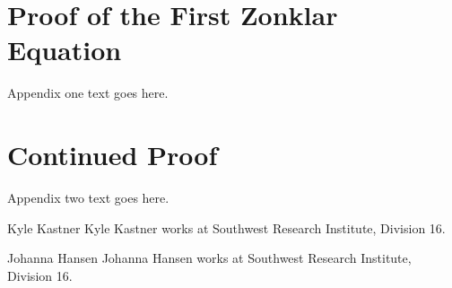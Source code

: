 \documentclass[journal]{IEEEtran}
\begin{document}
\appendices
\section{Proof of the First Zonklar Equation}
Appendix one text goes here.

\section{Continued Proof}
Appendix two text goes here.


\begin{IEEEbiographynophoto}{Kyle Kastner}
Kyle Kastner works at Southwest Research Institute, Division 16.
\end{IEEEbiographynophoto}

\begin{IEEEbiographynophoto}{Johanna Hansen}
Johanna Hansen works at Southwest Research Institute, Division 16.
\end{IEEEbiographynophoto}




\end{document}
